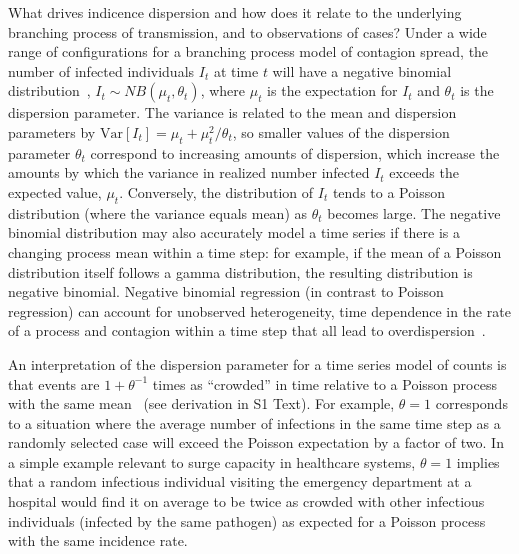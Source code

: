 \documentclass[11pt,letterpaper]{article}
\begin{document}
What drives indicence dispersion and how does it relate to the underlying branching process of transmission, and to observations of cases? 
Under a wide range of configurations for a branching process model of contagion spread, the number of infected individuals $I_t$ at time $t$ will have a negative binomial distribution~\citep{kendall1949stochastic, grenfell2002dynamics}, $I_t \sim NB \left( \mu_t, \theta_t \right)$, where $\mu_t$ is the expectation for $I_t$ and $\theta_t$ is the dispersion parameter. 
The variance is related to the mean and dispersion parameters by $\mathrm{Var}[I_t] = \mu_t + \mu_t^2 / \theta_t$, so smaller values of the dispersion parameter $\theta_t$ correspond to increasing amounts of dispersion, which increase the amounts by which the variance in realized number infected $I_t$ exceeds the expected value, $\mu_t$. 
Conversely, the distribution of $I_t$ tends to a Poisson distribution (where the variance equals mean) as $\theta_t$ becomes large. 
The negative binomial distribution may also accurately model a time series if there is a changing process mean within a time step: for example, if the mean of a Poisson distribution itself follows a gamma distribution, the resulting distribution is negative binomial. 
Negative binomial regression (in contrast to Poisson regression) can account for unobserved heterogeneity, time dependence in the rate of a process and contagion within a time step that all lead to overdispersion~\citep{barron1992analysis}.

An interpretation of the dispersion parameter for a time series model of counts is that events are $1 + \theta^{-1}$ times as ``crowded'' in time relative to a Poisson process with the same mean~\citep{lloyd1967mean} (see derivation in S1 Text). 
For example, $\theta = 1$ corresponds to a situation where the average number of infections in the same time step as a randomly selected case will exceed the Poisson expectation by a factor of two. 
In a simple example relevant to surge capacity in healthcare systems, $\theta = 1$ implies that a random infectious individual visiting the emergency department at a hospital would find it on average to be twice as crowded with other infectious individuals (infected by the same pathogen) as expected for a Poisson process with the same incidence rate.
\end{document}
